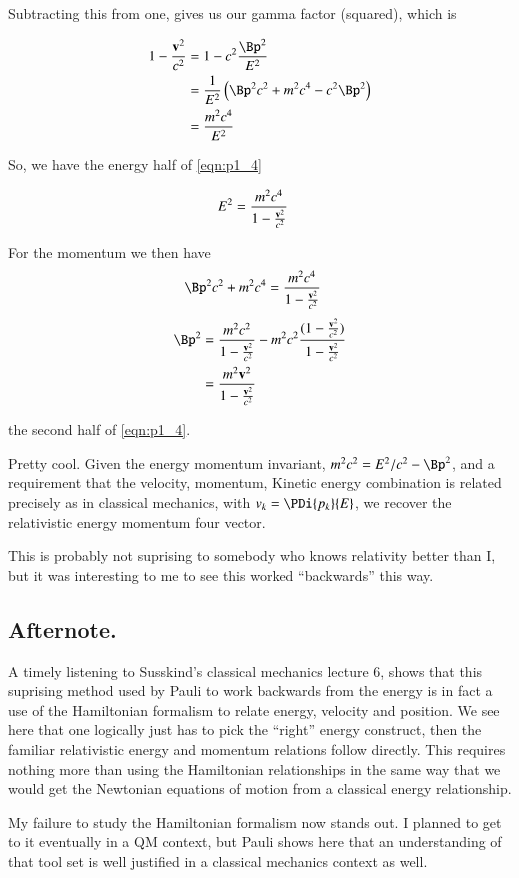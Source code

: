 \documentclass{article}
\begin{document}
Subtracting this from one, gives us our gamma factor (squared), which is

\begin{align*}
1 - \frac{\Bv^2}{c^2} 
&= 1 - c^2 \frac{\Bp^2}{E^2} \\
&= \inv{E^2} \left( \Bp^2 c^2 + m^2 c^4  - c^2 {\Bp^2} \right) \\
&= \frac{m^2 c^4}{E^2} \\
\end{align*}

So, we have the energy half of \ref{eqn:p1_4}

\begin{align*}
E^2 &= \frac{m^2 c^4}{1 - \frac{\mathbf{v}^2}{c^2} }
\end{align*}

For the momentum we then have
\begin{align*}
\Bp^2 c^2 + m^2 c^4 &= \frac{m^2 c^4}{1 - \frac{\Bv^2}{c^2} }
\end{align*}
\begin{align*}
\Bp^2 
&= \frac{m^2 c^2}{1 - \frac{\Bv^2}{c^2} } - m^2 c^2 \frac{(1 - \frac{\Bv^2}{c^2} )}{1 - \frac{\Bv^2}{c^2} } \\
&= \frac{m^2 \Bv^2}{1 - \frac{\Bv^2}{c^2} } 
\end{align*}

the second half of \ref{eqn:p1_4}.

Pretty cool.  Given the energy momentum invariant, $m^2 c^2 = E^2/c^2 - \Bp^2$, and a requirement that the velocity, momentum, Kinetic energy combination is related precisely as in classical mechanics, with $v_k = \PDi{p_k}{E}$, we
recover the relativistic energy momentum four vector.

This is probably not suprising to somebody who knows relativity better than I, but it was
interesting to me to see this worked ``backwards'' this way.

\subsection{ Afternote. }

A timely listening to Susskind's classical mechanics lecture 6, shows that 
this suprising method used by Pauli to work backwards from the energy 
is in fact a use of the Hamiltonian formalism to relate energy, velocity
and position.  We see here that one logically just has to pick the ``right''
energy construct, then the familiar relativistic energy and momentum relations
follow directly.  This requires nothing more than using the Hamiltonian
relationships in the same way that we would get the Newtonian equations
of motion from a classical energy relationship.

My failure to study the Hamiltonian formalism now stands out.  I planned to 
get to it eventually in a QM context, but Pauli shows here that an understanding
of that tool set is well justified in a classical mechanics context as well.



\end{document}

